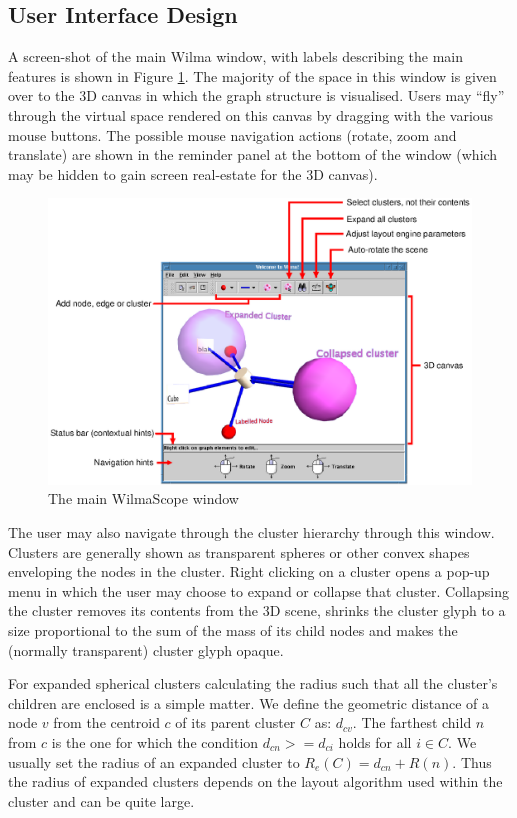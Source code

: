 \documentclass[runningheads]{cl2emult}
\begin{document}
\subsection{User Interface Design}
A screen-shot of the main Wilma window, with labels describing the main
features is shown in Figure \ref{fig-controls}.
The majority of the space in this window is given over to the 3D
canvas in which the graph structure is visualised.  Users may ``fly''
through the virtual space rendered on this canvas by dragging with the
various mouse buttons.  The possible mouse navigation actions (rotate,
zoom and translate) are
shown in the reminder panel at the bottom of the window (which may be
hidden to gain screen real-estate for the 3D canvas).
\begin{figure}[h]
  \centering
    \label{fig-controls}
    \includegraphics[width=\textwidth]{figures/wilmacontrols.eps}
    \caption{The main WilmaScope window}
\end{figure}

The user may also navigate through the cluster hierarchy through this
window.  Clusters are generally shown as transparent spheres or other
convex shapes enveloping the nodes in the cluster.  Right clicking on a
cluster opens a pop-up menu in which the user may choose to expand or
collapse that cluster.  Collapsing the cluster removes its contents
from the 3D scene, shrinks the cluster glyph to a
size proportional to the sum of the mass of its child nodes
and makes the (normally transparent) cluster glyph opaque.

For expanded spherical clusters calculating the radius such that all the
cluster's children are enclosed is a simple matter.
We define the geometric distance of a node $v$ from the centroid
$c$ of its parent cluster $C$ as: $d_{cv}$.  The farthest child $n$ from
$c$ is the one for which the condition $d_{cn} >= d_{ci}$ holds for
all $i \in C$.  We usually set the radius of an expanded cluster to
${R_e}(C) = d_{cn} + R(n)$.  Thus the radius of expanded clusters
depends on the layout algorithm used within the cluster and can be
quite large.
\end{document}

